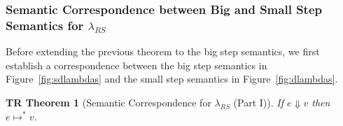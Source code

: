 \documentclass[12pt]{article}
\newtheorem{trthm}[tr]{TR Theorem}
\theoremstyle{definition}
\newcommand{\lambdas}{\lambda_{RS}}
\newcommand{\sreduces}{ \Downarrow }
\begin{document}
\subsubsection{Semantic Correspondence between Big and Small Step Semantics for $\lambdas$}

Before extending the previous theorem to the big step semantics, we first establish a correspondence between
the big step semantics in Figure~\ref{fig:sdlambdas} and the small step semantics in Figure~\ref{fig:dlambdas}.

\begin{trthm}[Semantic Correspondence for $\lambdas$ (Part I)]
If $e \sreduces v$ then $e \mapsto^* v$.  
\end{trthm}
\end{document}

